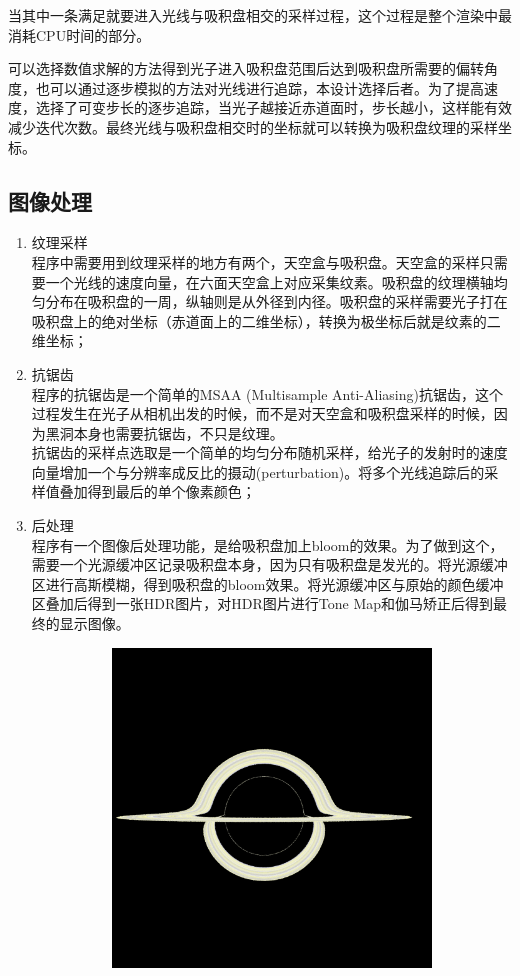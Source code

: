 当其中一条满足就要进入光线与吸积盘相交的采样过程，这个过程是整个渲染中最消耗CPU时间的部分。

可以选择数值求解的方法得到光子进入吸积盘范围后达到吸积盘所需要的偏转角度，也可以通过逐步模拟的方法对光线进行追踪，本设计选择后者。为了提高速度，选择了可变步长的逐步追踪，当光子越接近赤道面时，步长越小，这样能有效减少迭代次数。最终光线与吸积盘相交时的坐标就可以转换为吸积盘纹理的采样坐标。

\subsection{图像处理}

\begin{enumerate}
    \item 纹理采样 \\ 程序中需要用到纹理采样的地方有两个，天空盒与吸积盘。天空盒的采样只需要一个光线的速度向量，在六面天空盒上对应采集纹素。吸积盘的纹理横轴均匀分布在吸积盘的一周，纵轴则是从外径到内径。吸积盘的采样需要光子打在吸积盘上的绝对坐标（赤道面上的二维坐标），转换为极坐标后就是纹素的二维坐标；
    \item 抗锯齿 \\ 程序的抗锯齿是一个简单的MSAA (Multisample Anti-Aliasing)抗锯齿，这个过程发生在光子从相机出发的时候，而不是对天空盒和吸积盘采样的时候，因为黑洞本身也需要抗锯齿，不只是纹理。\\ 抗锯齿的采样点选取是一个简单的均匀分布随机采样，给光子的发射时的速度向量增加一个与分辨率成反比的摄动(perturbation)。将多个光线追踪后的采样值叠加得到最后的单个像素颜色；
    \item 后处理 \\ 程序有一个图像后处理功能，是给吸积盘加上bloom的效果。为了做到这个，需要一个光源缓冲区记录吸积盘本身，因为只有吸积盘是发光的。将光源缓冲区进行高斯模糊，得到吸积盘的bloom效果。将光源缓冲区与原始的颜色缓冲区叠加后得到一张HDR图片，对HDR图片进行Tone Map和伽马矫正后得到最终的显示图像。
          \begin{figure}[H]
              \centering
              \begin{subfigure}{.5\textwidth}
                  \centering
                  \includegraphics[width=.8\linewidth]{images/no-bloom.png}

\end{subfigure}
\end{figure}
\end{enumerate}
